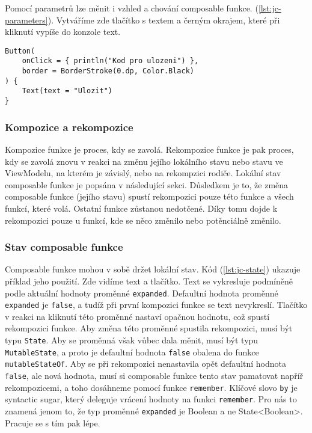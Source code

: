 \noindent Pomocí parametrů lze měnit i vzhled a chování composable funkce. (\ref{lst:jc-parameters}). Vytváříme zde tlačítko  s textem a černým okrajem, které při kliknutí vypíše do konzole text.

\begin{lstlisting}[caption={Příklad parametrů pro změnu vzhledu a chování.}, label={lst:jc-parameters}, tabsize=2]
Button(
	onClick = { println("Kod pro ulozeni") },
	border = BorderStroke(0.dp, Color.Black)
) {
	Text(text = "Ulozit")
}
\end{lstlisting}

\vspace*{10px}

\subsubsection*{Kompozice a rekompozice}
Kompozice funkce je proces, kdy se zavolá. Rekompozice funkce je pak proces, kdy se zavolá znovu v reakci na změnu jejího lokálního stavu nebo stavu ve ViewModelu, na kterém je závislý, nebo na rekompzici rodiče. Lokální stav composable funkce je popsána v následující sekci. Důsledkem je to, že změna composable funkce (jejího stavu) spustí rekompozici pouze této funkce a všech funkcí, které volá. Ostatní funkce zůstanou nedotčené. Díky tomu dojde k rekompozici pouze u funkcí, kde se něco změnilo nebo potěnciálně změnilo.

\vspace*{10px}

\subsubsection*{Stav composable funkce}
Composable funkce mohou v sobě držet lokální stav. Kód (\ref{lst:jc-state}) ukazuje příklad jeho použití. Zde vidíme text a tlačítko. Text se vykresluje podmíněně podle aktuální hodnoty proměnné \lstinline|expanded|. Defaultní hodnota proměnné \lstinline|expanded| je \lstinline|false|, a tudíž při první kompozici funkce se text nevykreslí. Tlačítko v reakci na kliknutí této proměnné nastaví opačnou hodnotu, což spustí rekompozici funkce. Aby změna této proměnné spustila rekompozici, musí být typu \lstinline|State|. Aby se proměnná však vůbec dala měnit, musí být typu \lstinline|MutableState|, a proto je defaultní hodnota \lstinline|false| obalena do funkce \lstinline|mutableStateOf|. Aby se při rekompozici nenastavila opět defaultní hodnota \lstinline|false|, ale nová hodnota, musí si composable funkce tento stav pamatovat napříř rekompozicemi, a toho dosáhneme pomocí funkce \lstinline|remember|. Klíčové slovo \lstinline|by| je syntactic sugar, který deleguje vrácení hodnoty na funkci \lstinline|remember|. Pro nás to znamená jenom to, že typ proměnné \lstinline|expanded| je Boolean a ne State<Boolean>. Pracuje se s tím pak lépe. 

